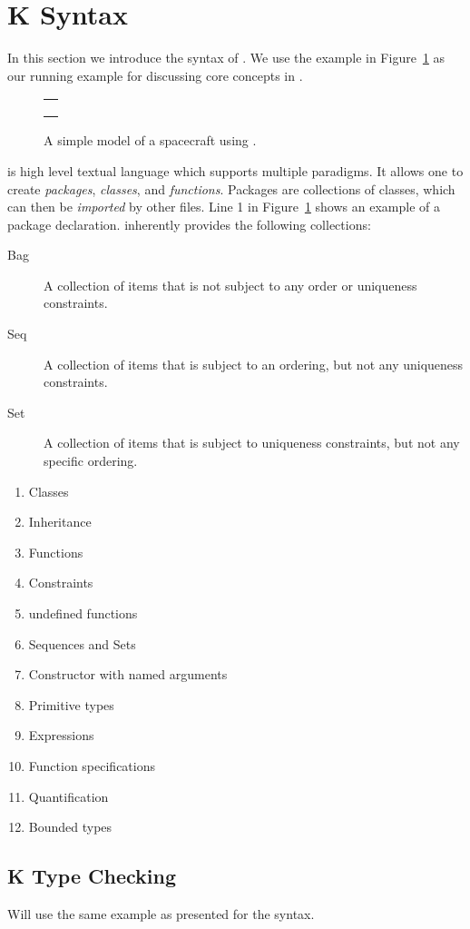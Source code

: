 \section{K Syntax}
\label{sec:k-syntax}

In this section we introduce the syntax of \Klang{}. We use the
\Klang{} example in Figure~\ref{fig:fs} as our running example for
discussing core concepts in \Klang{}.

\begin{figure}
\centering
\begin{tabular}{c}
\hline \\
 \\ \\
\hline
\end{tabular}
\caption{A simple model of a spacecraft using \Klang{}.}
\label{fig:fs}
\end{figure}

\Klang{} is high level textual language which supports multiple
paradigms. It allows one to create {\em packages}, {\em classes}, and
{\em functions}. Packages are collections of classes, which can then
be {\em imported} by other \Klang{} files. Line 1 in
Figure~\ref{fig:fs} shows an example of a package
declaration. \Klang{} inherently provides the following collections:

\begin{description}
\item [Bag] A collection of items that is not subject to any order
  or uniqueness constraints.
\item [Seq] A collection of items that is subject to an ordering, but
  not any uniqueness constraints.
\item [Set] A collection of items that is subject to uniqueness
  constraints, but not any specific ordering.
\end{description}





\begin{enumerate}
\item Classes
\item Inheritance
\item Functions
\item Constraints
\item undefined functions
\item Sequences and Sets
\item Constructor with named arguments
\item Primitive types
\item Expressions
\item Function specifications
\item Quantification
\item Bounded types
\end{enumerate}

\subsection{K Type Checking}

Will use the same example as presented for the syntax.

